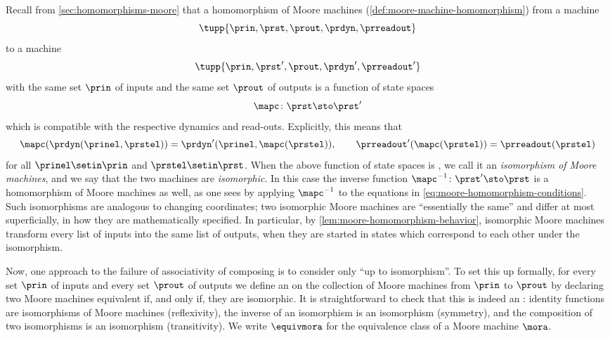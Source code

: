Recall from \cref{sec:homomorphisms-moore} that a homomorphism of Moore machines (\cref{def:moore-machine-homomorphism}) from a machine
\begin{equation}
    \tupp{\prin, \prst, \prout, \prdyn, \prreadout}
\end{equation}
to a machine
\begin{equation}
    \tupp{\prin, \prst', \prout, \prdyn', \prreadout'}
\end{equation}
with the same set $\prin$ of inputs and the same set $\prout$ of outputs is a function of state spaces
\begin{equation}
    \mapc \colon \prst \sto \prst'
\end{equation}
which is compatible with the respective dynamics and read-outs.
Explicitly, this means that
\begin{equation}
    \label{eq:moore-homomorphism-conditions}
    \mapc(\prdyn(\prinel, \prstel)) = \prdyn'(\prinel, \mapc(\prstel)),
    \qquad
    \prreadout'(\mapc(\prstel)) = \prreadout(\prstel)
\end{equation}
for all $\prinel \setin \prin$ and $\prstel \setin \prst$.
When the above function of state spaces is , we call it an \emph{isomorphism of Moore machines}, and we say that the two machines are \emph{isomorphic}.
In this case the inverse function $\mapc^{-1} \colon \prst' \sto \prst$ is a homomorphism of Moore machines as well, as one sees by applying $\mapc^{-1}$ to the equations in \cref{eq:moore-homomorphism-conditions}.
Such isomorphisms are analogous to changing coordinates; two isomorphic Moore machines are ``essentially the same'' and differ at most superficially, in how they are mathematically specified.
In particular, by \cref{lem:moore-homomorphism-behavior}, isomorphic Moore machines transform every list of inputs into the same list of outputs, when they are started in states which correspond to each other under the isomorphism.

Now, one approach to the failure of associativity of composing  is to consider  only ``up to isomorphism''.
To set this up formally, for every set $\prin$ of inputs and every set $\prout$ of outputs we define an  on the collection of Moore machines from $\prin$ to $\prout$ by declaring two Moore machines equivalent if, and only if, they are isomorphic.
It is straightforward to check that this is indeed an : identity functions are isomorphisms of Moore machines (reflexivity), the inverse of an isomorphism is an isomorphism (symmetry), and the composition of two isomorphisms is an isomorphism (transitivity).
We write $\equivmora$ for the equivalence class of a Moore machine $\mora$.

